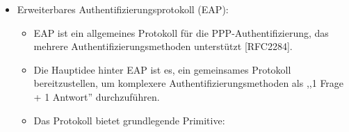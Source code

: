 \documentclass[a4paper]{article}
\begin{document}
\begin{multicols}{3}
\begin{itemize}
              \begin{itemize}
                  \item
                        Code: 1 \textasciitilde{} Herausforderung / 2 \textasciitilde{}
                        Antwort / 3 \textasciitilde{} Erfolg / 4 \textasciitilde{} Fehler
                  \item
                        Identifier: ein Oktett, das bei jeder gesendeten Challenge geändert
                        werden muss
                  \item
                        Länge: die Gesamtlänge der CHAP-Nachricht in Oktetten
                  \item
                        Value Size: ein Oktett, das die Länge des Wertes angibt
                  \item
                        Wert: enthält die zufällige Herausforderung / die Antwort auf die
                        Herausforderung
                  \item
                        Name: ein oder mehrere Oktette, die das System identifizieren, das
                        das Paket erstellt hat; die Größe des Namens wird anhand des
                        Längenfeldes berechnet
                  \item
                  \item
                        Nachricht:

                        \begin{itemize}
                            \item
                                  Null oder mehr Oktette mit implementierungsabhängigem Inhalt
                            \item
                                  Der Inhalt soll für den Menschen lesbar sein und hat keinen
                                  Einfluss auf die Funktionsweise des Protokolls
                        \end{itemize}
                  \item
              \end{itemize}
        \item
              Erweiterbares Authentifizierungsprotokoll (EAP):

              \begin{itemize}
                  \item
                        EAP ist ein allgemeines Protokoll für die PPP-Authentifizierung, das
                        mehrere Authentifizierungsmethoden unterstützt {[}RFC2284{]}.
                  \item
                        Die Hauptidee hinter EAP ist es, ein gemeinsames Protokoll
                        bereitzustellen, um komplexere Authentifizierungsmethoden als ,,1
                        Frage + 1 Antwort'' durchzuführen.
                  \item
                        Das Protokoll bietet grundlegende Primitive:


\end{itemize}
\end{itemize}
\end{multicols}
\end{document}
